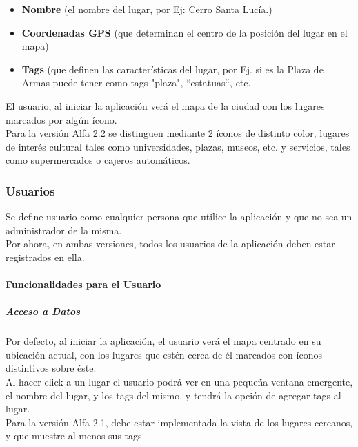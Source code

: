 \documentclass[10pt,letterpaper]{article}
\begin{document}
\begin{itemize}
 \item \textbf{Nombre} (el nombre del lugar, por Ej: Cerro Santa Lucía.)
 \item \textbf{Coordenadas GPS} (que determinan el centro de la posición del lugar en el mapa)
 \item \textbf{Tags} (que definen las características del lugar, por Ej. si es la Plaza de Armas puede tener como tags "plaza", ``estatuas``, etc.
\end{itemize}

El usuario, al iniciar la aplicación verá el mapa de la ciudad con los lugares marcados por algún ícono.\\

Para la versión Alfa 2.2 se distinguen mediante 2 íconos de distinto color, lugares de interés cultural tales como universidades, plazas, museos, etc. y servicios, tales como supermercados o cajeros automáticos.

\subsubsection{Usuarios}

Se define usuario como cualquier persona que utilice la aplicación y que no sea un administrador de la misma.\\

Por ahora, en ambas versiones, todos los usuarios de la aplicación deben estar registrados en ella.\\

\paragraph{Funcionalidades para el Usuario}

\subparagraph{Acceso a Datos}

Por defecto, al iniciar la aplicación, el usuario verá el mapa centrado en su ubicación actual, con los lugares que estén cerca de él marcados con íconos distintivos sobre éste.\\

Al hacer click a un lugar el usuario podrá ver en una pequeña ventana emergente, el nombre del lugar, y los tags del mismo, y tendrá la opción de agregar tags al lugar.\\

Para la versión Alfa 2.1, debe estar implementada la vista de los lugares cercanos, y que muestre al menos sus tags.\\
\end{document}
